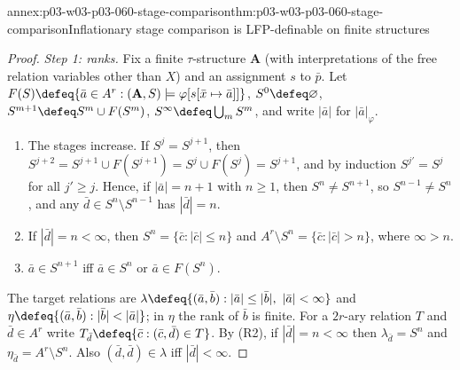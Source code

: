 \begin{annexitem}{annex:p03-w03-p03-060-stage-comparison}{thm:p03-w03-p03-060-stage-comparison}{Inflationary stage comparison is LFP-definable on finite structures}
\begin{proof}
\emph{Step 1: ranks.} Fix a finite \(\tau\)-structure \(\mathbf A\) (with
interpretations of the free relation variables other than \(X\)) and an
assignment \(s\) to \(\bar p\). Let
\(F(S)\defeq\{\bar a\in A^r:(\mathbf A,S)\models\varphi[s[\bar x\mapsto\bar a]]\}\),
\(S^0\defeq\varnothing\), \(S^{m+1}\defeq S^m\cup F(S^m)\),
\(S^\infty\defeq\bigcup_mS^m\), and write \(|\bar a|\) for
\(|\bar a|_\varphi\).
\begin{enumerate}
\item[(R1)] The stages increase. If \(S^j=S^{j+1}\), then
      \(S^{j+2}=S^{j+1}\cup F(S^{j+1})=S^j\cup F(S^j)=S^{j+1}\), and by
      induction \(S^{j'}=S^j\) for all \(j'\ge j\). Hence, if
      \(|\bar a|=n+1\) with \(n\ge1\), then \(S^n\neq S^{n+1}\), so
      \(S^{n-1}\neq S^n\), and any \(\bar d\in S^n\setminus S^{n-1}\) has
      \(|\bar d|=n\).
\item[(R2)] If \(|\bar d|=n<\infty\), then
      \(S^n=\{\bar c:|\bar c|\le n\}\) and
      \(A^r\setminus S^n=\{\bar c:|\bar c|>n\}\), where \(\infty>n\).
\item[(R3)] \(\bar a\in S^{n+1}\) iff \(\bar a\in S^n\) or
      \(\bar a\in F(S^n)\).
\end{enumerate}
The target relations are
\(\lambda\defeq\{(\bar a,\bar b):|\bar a|\le|\bar b|,\ |\bar a|<\infty\}\)
and \(\eta\defeq\{(\bar a,\bar b):|\bar b|<|\bar a|\}\); in \(\eta\) the
rank of \(\bar b\) is finite. For a \(2r\)-ary relation \(T\) and
\(\bar d\in A^r\) write \(T_{\bar d}\defeq\{\bar c:(\bar c,\bar d)\in T\}\).
By (R2), if \(|\bar d|=n<\infty\) then \(\lambda_{\bar d}=S^n\) and
\(\eta_{\bar d}=A^r\setminus S^n\). Also \((\bar d,\bar d)\in\lambda\) iff
\(|\bar d|<\infty\).


\end{proof}
\end{annexitem}
